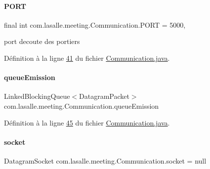 \paragraph{\texorpdfstring{P\+O\+RT}{PORT}}
{\footnotesize\ttfamily final int com.\+lasalle.\+meeting.\+Communication.\+P\+O\+RT = 5000\hspace{0.3cm}{\ttfamily [static]}, {\ttfamily [private]}}



port d\textquotesingle{}ecoute des portiers 



Définition à la ligne \hyperlink{_communication_8java_source_l00041}{41} du fichier \hyperlink{_communication_8java_source}{Communication.\+java}.

\mbox{\label{classcom_1_1lasalle_1_1meeting_1_1_communication_a733017de1be51e6e6ebf6719009ede30}} 
\paragraph{\texorpdfstring{queue\+Emission}{queueEmission}}
{\footnotesize\ttfamily Linked\+Blocking\+Queue$<$Datagram\+Packet$>$ com.\+lasalle.\+meeting.\+Communication.\+queue\+Emission\hspace{0.3cm}{\ttfamily [private]}}



Définition à la ligne \hyperlink{_communication_8java_source_l00045}{45} du fichier \hyperlink{_communication_8java_source}{Communication.\+java}.

\mbox{\label{classcom_1_1lasalle_1_1meeting_1_1_communication_a2a538f36640aecebbb833bbaf1f03858}} 
\paragraph{\texorpdfstring{socket}{socket}}
{\footnotesize\ttfamily Datagram\+Socket com.\+lasalle.\+meeting.\+Communication.\+socket = null\hspace{0.3cm}{\ttfamily [private]}}



